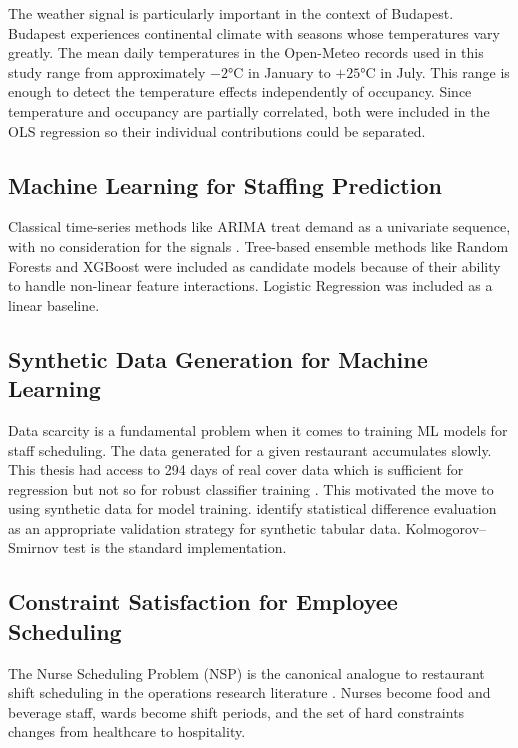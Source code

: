 \documentclass[12pt,a4paper,oneside]{article}
\begin{document}
The weather signal is particularly important in the context of Budapest. Budapest experiences continental climate with seasons whose temperatures vary greatly. The mean daily temperatures in the Open-Meteo records used in this study \citep{openmeteo2023} range from approximately  $-2$°C in January to $+25$°C in July. This range is enough to detect the temperature effects independently of occupancy.  Since temperature and occupancy are partially correlated, both were included in the OLS regression so their individual contributions could be separated.


\subsection{Machine Learning for Staffing Prediction}

Classical time-series methods like ARIMA treat demand as a univariate sequence, with no consideration for the signals \citep{hyndman2018}.  Tree-based ensemble methods like Random Forests \citep{breiman2001} and XGBoost \citep{chen2016} were included as candidate models because of their ability to handle non-linear feature interactions. Logistic Regression was included as a linear baseline.

\subsection{Synthetic Data Generation for Machine Learning}

Data scarcity is a fundamental problem when it comes to training ML models for staff scheduling. The data generated for a given restaurant accumulates slowly. This thesis had access to 294 days of real cover data which is sufficient for regression but not so for robust classifier training \citep{lu2023}. This motivated the move to using synthetic data for model training. \citet{lu2023} identify statistical difference evaluation as an appropriate validation strategy for synthetic tabular data. Kolmogorov--Smirnov test is the standard implementation.

\subsection{Constraint Satisfaction for Employee Scheduling}

The Nurse Scheduling Problem (NSP) is the canonical analogue to restaurant shift scheduling in the operations research literature \citep{bensaid2024}. Nurses become food and beverage staff, wards become shift periods, and the set of hard constraints changes from healthcare to hospitality.
\end{document}
